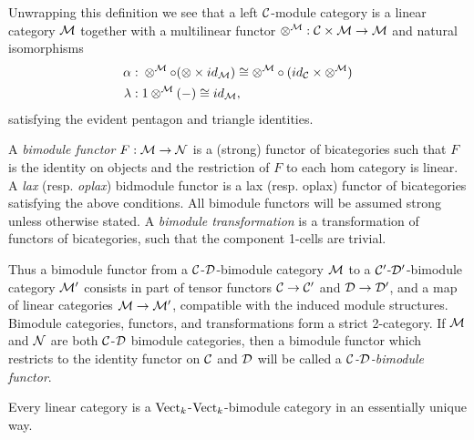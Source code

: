 \documentclass{amsart}
\begin{document}
Unwrapping this definition we see that a left $\mathcal C$-module category is a linear category $\mathcal M$ together with a multilinear functor $\otimes^{\mathcal M}: \mathcal C \times \mathcal M \to \mathcal M$ and natural isomorphisms
	\begin{align*}
		\alpha: & \;    \otimes^{\mathcal M} \circ (\otimes \times id_{\mathcal M}) \cong  \otimes^{\mathcal M} \circ (id_{\mathcal C} \times \otimes^{\mathcal M}) \\
		\lambda: & \; 1 \otimes^{\mathcal M}(-) \cong id_{\mathcal M},
	\end{align*}
	satisfying the evident pentagon and triangle identities. 

\begin{definition}
	A {\em bimodule functor} $F:\mathcal M \to \mathcal N$ is a (strong) functor of bicategories such that
		 $F$ is the identity on objects and 
		 the restriction of $F$ to each hom category is linear. 
A {\em lax} (resp. {\em oplax}) bidmodule functor is a lax (resp. oplax) functor of bicategories satisfying the above conditions. All bimodule functors will be assumed strong unless otherwise stated. 
	A {\em bimodule transformation} is a transformation of functors of bicategories, such that the component 1-cells are trivial. 
\end{definition}
	
Thus a bimodule functor from a $\mathcal C$-$\mathcal D$-bimodule category $\mathcal M$ to a $\mathcal C'$-$\mathcal D'$-bimodule category $\mathcal M'$ consists in part of tensor functors $\mathcal C \to \mathcal C'$ and $\mathcal D \to \mathcal D'$, and a map of linear categories $\mathcal M \to \mathcal M'$, compatible with the induced module structures. Bimodule categories, functors, and transformations form a strict 2-category. 	
If $\mathcal M$ and $\mathcal N$ are both $\mathcal C$-$\mathcal D$ bimodule categories, then a bimodule functor which restricts to the identity functor on $\mathcal C$ and $\mathcal D$ will be called a {\em $\mathcal C$-$\mathcal D$-bimodule functor}.

\begin{example}
	Every linear category is a $\mathrm{Vect}_k$-$\mathrm{Vect}_k$-bimodule category in an essentially unique way. 
\end{example}
\end{document}
